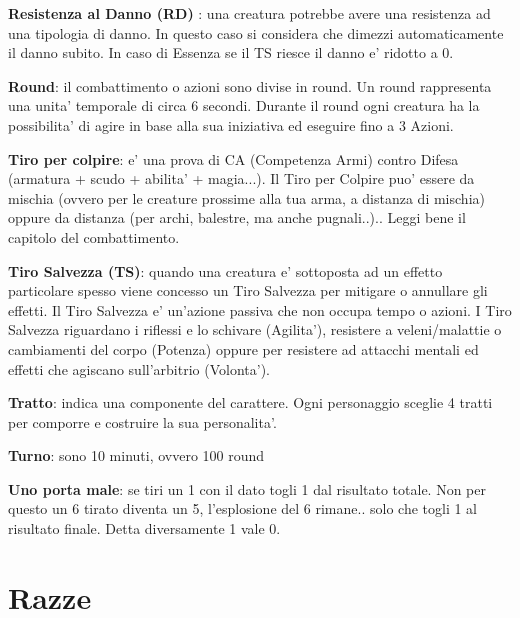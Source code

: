 \documentclass[a4paper,11pt,twoside,openany]{book}
\begin{document}
\textbf{Resistenza al Danno (RD)}  : una creatura potrebbe avere una resistenza ad una tipologia di danno. In questo caso si considera che dimezzi automaticamente il danno subito.
In caso di Essenza se il TS riesce il danno e' ridotto a 0.

\textbf{Round}: il combattimento o azioni sono divise in round. Un round rappresenta una unita' temporale di circa 6 secondi. Durante il round ogni creatura ha la possibilita' di agire in base alla sua iniziativa ed eseguire fino a 3 Azioni.

\textbf{Tiro per colpire}: e' una prova di CA (Competenza Armi) contro Difesa (armatura + scudo + abilita' + magia...). Il Tiro per Colpire puo' essere da mischia (ovvero per le creature prossime alla tua arma, a distanza di mischia) oppure da distanza (per archi, balestre, ma anche pugnali..).. Leggi bene il capitolo del combattimento.

\textbf{Tiro Salvezza (TS)}: quando una creatura e' sottoposta ad un effetto particolare spesso viene concesso un Tiro Salvezza per mitigare o annullare gli effetti. Il Tiro Salvezza e' un'azione passiva che non occupa tempo o azioni. 
I Tiro Salvezza riguardano i riflessi e lo schivare (Agilita'), resistere a veleni/malattie o cambiamenti del corpo (Potenza) oppure per resistere ad attacchi mentali ed effetti che agiscano sull'arbitrio (Volonta').

\textbf{Tratto}: indica una componente del carattere. Ogni personaggio sceglie 4 tratti per comporre e costruire la sua personalita'.

\textbf{Turno}: sono 10 minuti, ovvero 100 round

\textbf{Uno porta male}: se tiri un 1 con il dato togli 1 dal risultato totale. Non per questo un 6 tirato diventa un 5, l’esplosione del 6 rimane.. solo che togli 1 al risultato finale. Detta diversamente 1 vale 0.



\pagebreak


\section{Razze}
\end{document}
